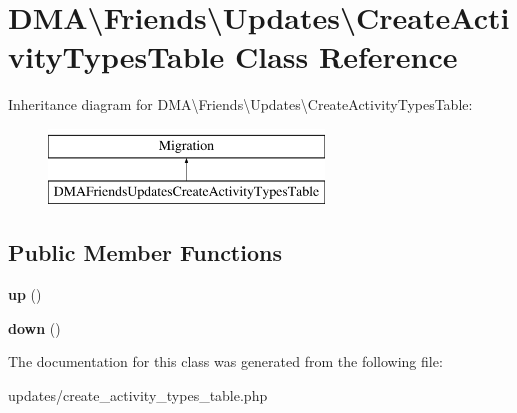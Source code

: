 \hypertarget{classDMA_1_1Friends_1_1Updates_1_1CreateActivityTypesTable}{\section{D\-M\-A\textbackslash{}Friends\textbackslash{}Updates\textbackslash{}Create\-Activity\-Types\-Table Class Reference}
\label{classDMA_1_1Friends_1_1Updates_1_1CreateActivityTypesTable}
}
Inheritance diagram for D\-M\-A\textbackslash{}Friends\textbackslash{}Updates\textbackslash{}Create\-Activity\-Types\-Table\-:\begin{figure}[H]
\begin{center}
\leavevmode
\includegraphics[height=2.000000cm]{d7/dc7/classDMA_1_1Friends_1_1Updates_1_1CreateActivityTypesTable}
\end{center}
\end{figure}
\subsection*{Public Member Functions}
\begin{DoxyCompactItemize}
\item 
\hypertarget{classDMA_1_1Friends_1_1Updates_1_1CreateActivityTypesTable_aac20febd60bd0cf8de2c88d255822596}{{\bfseries up} ()}\label{classDMA_1_1Friends_1_1Updates_1_1CreateActivityTypesTable_aac20febd60bd0cf8de2c88d255822596}

\item 
\hypertarget{classDMA_1_1Friends_1_1Updates_1_1CreateActivityTypesTable_ab23b99ba1524566c643de629ed4a5126}{{\bfseries down} ()}\label{classDMA_1_1Friends_1_1Updates_1_1CreateActivityTypesTable_ab23b99ba1524566c643de629ed4a5126}

\end{DoxyCompactItemize}


The documentation for this class was generated from the following file\-:\begin{DoxyCompactItemize}
\item 
updates/create\-\_\-activity\-\_\-types\-\_\-table.\-php\end{DoxyCompactItemize}
